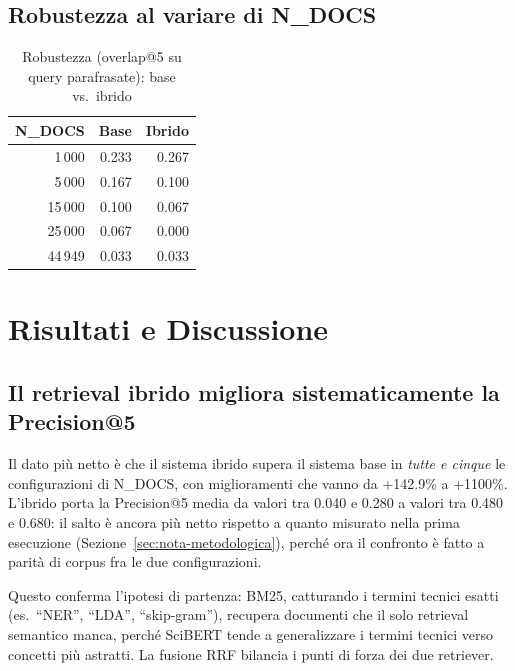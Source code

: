 \documentclass[12pt,a4paper]{article}
\begin{document}
\subsection{Robustezza al variare di N\_DOCS}

\begin{table}[H]
  \centering
  \caption{Robustezza (overlap@5 su query parafrasate): base vs.\ ibrido}
  \begin{tabular}{rrr}
    \toprule
    \textbf{N\_DOCS} & \textbf{Base} & \textbf{Ibrido} \\
    \midrule
    1\,000  & 0.233 & 0.267 \\
    5\,000  & 0.167 & 0.100 \\
    15\,000 & 0.100 & 0.067 \\
    25\,000 & 0.067 & 0.000 \\
    44\,949 & 0.033 & 0.033 \\
    \bottomrule
  \end{tabular}
\end{table}

\section{Risultati e Discussione}

\subsection{Il retrieval ibrido migliora sistematicamente la Precision@5}

Il dato pi\`u netto \`e che il sistema ibrido supera il sistema base in \textit{tutte e cinque} le configurazioni di N\_DOCS, con miglioramenti che vanno da +142.9\% a +1100\%. L'ibrido porta la Precision@5 media da valori tra 0.040 e 0.280 a valori tra 0.480 e 0.680: il salto \`e ancora pi\`u netto rispetto a quanto misurato nella prima esecuzione (Sezione~\ref{sec:nota-metodologica}), perch\'e ora il confronto \`e fatto a parit\`a di corpus fra le due configurazioni.

Questo conferma l'ipotesi di partenza: BM25, catturando i termini tecnici esatti (es.\ ``NER'', ``LDA'', ``skip-gram''), recupera documenti che il solo retrieval semantico manca, perch\'e SciBERT tende a generalizzare i termini tecnici verso concetti pi\`u astratti. La fusione RRF bilancia i punti di forza dei due retriever.
\end{document}
